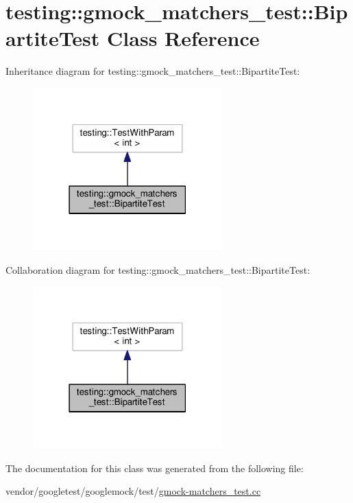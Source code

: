 \hypertarget{classtesting_1_1gmock__matchers__test_1_1BipartiteTest}{}\section{testing\+:\+:gmock\+\_\+matchers\+\_\+test\+:\+:Bipartite\+Test Class Reference}
\label{classtesting_1_1gmock__matchers__test_1_1BipartiteTest}


Inheritance diagram for testing\+:\+:gmock\+\_\+matchers\+\_\+test\+:\+:Bipartite\+Test\+:
\nopagebreak
\begin{figure}[H]
\begin{center}
\leavevmode
\includegraphics[width=207pt]{classtesting_1_1gmock__matchers__test_1_1BipartiteTest__inherit__graph}
\end{center}
\end{figure}


Collaboration diagram for testing\+:\+:gmock\+\_\+matchers\+\_\+test\+:\+:Bipartite\+Test\+:
\nopagebreak
\begin{figure}[H]
\begin{center}
\leavevmode
\includegraphics[width=207pt]{classtesting_1_1gmock__matchers__test_1_1BipartiteTest__coll__graph}
\end{center}
\end{figure}


The documentation for this class was generated from the following file\+:\begin{DoxyCompactItemize}
\item 
vendor/googletest/googlemock/test/\hyperlink{gmock-matchers__test_8cc}{gmock-\/matchers\+\_\+test.\+cc}\end{DoxyCompactItemize}
